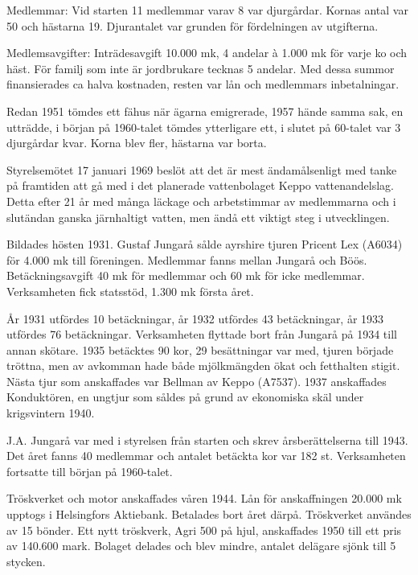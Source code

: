 Medlemmar: Vid starten 11 medlemmar varav 8 var djurgårdar. Kornas antal var 50 och hästarna 19. Djurantalet var grunden för fördelningen av utgifterna.

Medlemsavgifter: Inträdesavgift 10.000 mk, 4 andelar à 1.000 mk för varje ko och häst. För familj som inte är jordbrukare tecknas 5 andelar. Med dessa summor finansierades ca halva kostnaden, resten var lån och medlemmars inbetalningar.

Redan 1951 tömdes ett fähus när ägarna emigrerade, 1957 hände samma sak, en utträdde, i början på 1960-talet tömdes ytterligare ett, i slutet  på  60-talet var 3 djurgårdar kvar. Korna blev fler, hästarna var borta.

Styrelsemötet 17 januari 1969 beslöt att det är mest ändamålsenligt med tanke på framtiden att gå med i det planerade vattenbolaget Keppo vattenandelslag. Detta efter 21 år med många läckage och arbetstimmar av medlemmarna och i slutändan ganska järnhaltigt vatten, men ändå ett viktigt steg i utvecklingen.






Bildades hösten 1931. Gustaf Jungarå sålde ayrshire tjuren Pricent Lex (A6034) för 4.000 mk till 	föreningen. Medlemmar fanns mellan Jungarå och Böös. Betäckningsavgift 40 mk för medlemmar och 60 mk för icke	medlemmar. 	Verksamheten fick statsstöd, 1.300 mk första året.

År 1931 utfördes 10 betäckningar, år 1932 utfördes 43 betäckningar, år 1933 utfördes 76 betäckningar. 	Verksamheten flyttade bort från Jungarå på 1934 till annan skötare. 1935 betäcktes 90 kor, 29 besättningar var med, tjuren började tröttna, men av avkomman hade både mjölkmängden ökat och fetthalten stigit. Nästa tjur som anskaffades var Bellman av Keppo (A7537). 1937 anskaffades Konduktören,  en ungtjur som såldes på grund av ekonomiska skäl under krigsvintern 1940.

J.A. Jungarå var med i styrelsen från starten och skrev årsberättelserna till 1943. Det året fanns 40 medlemmar och antalet betäckta kor var 182 st. Verksamheten fortsatte till början 	på 1960-talet.





Tröskverket och motor anskaffades våren 1944. Lån för anskaffningen 20.000 mk upptogs i Helsingfors Aktiebank. Betalades bort året därpå. Tröskverket användes av 15 bönder. Ett nytt tröskverk, Agri 500 på hjul, anskaffades 1950 till ett pris av 140.600 mark. Bolaget delades och blev mindre, antalet delägare sjönk till 5 stycken.

